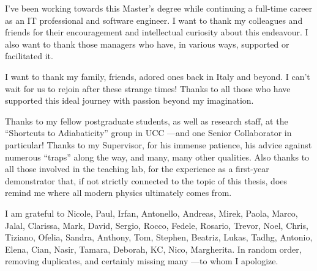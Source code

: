 I've been working towards this Master's degree 
while continuing a full-time career as an IT professional and software engineer. 
I want to thank my colleagues and friends 
for their encouragement and intellectual curiosity about this endeavour. 
I also want to thank those managers who have, 
in various ways, 
supported or facilitated it.

I want to thank my family, friends, adored ones back in Italy and beyond.
I can’t wait for us to rejoin after these strange times!
Thanks to all those who have supported this ideal journey with passion beyond my imagination.

Thanks to  my fellow postgraduate students, as well as research staff, at the
“Shortcuts to Adiabaticity” group in UCC ---and one Senior Collaborator in particular! 
Thanks to my Supervisor, for his immense patience, his advice against numerous “traps” along the way, 
and many, many other qualities. 
Also thanks to all those involved in the teaching lab, 
for the experience as a first-year demonstrator that, 
if not strictly connected to the topic of this thesis, 
does remind me where all modern physics ultimately comes from.

I am grateful to Nicole, Paul, Irfan, Antonello, Andreas, Mirek, Paola, Marco,
Jalal, Clarissa, Mark, David, Sergio, Rocco, Fedele, Rosario, Trevor, Noel, Chris, Tiziano, Ofelia,
Sandra, Anthony, Tom, Stephen, Beatriz, Lukas, Tadhg, Antonio, Elena, Cian, Nasir, Tamara, 
Deborah, KC, Nico, Margherita. 
In random order, removing duplicates, and certainly missing many ---to whom I apologize.
